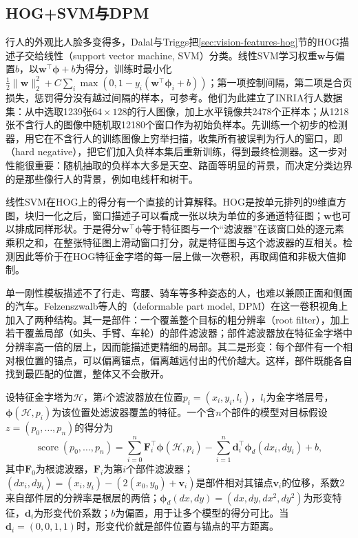 \subsection{HOG+SVM与DPM}
\label{sec:vision-features-dpm}
\label{sec:vision-features-hog-svm}

行人的外观比人脸多变得多，Dalal与Triggs把\ref{sec:vision-features-hog}节的HOG描述子交给线性（support vector machine, SVM）分类。线性SVM学习权重$\bm w$与偏置$b$，以$\bm w^{\top}\bm\phi+b$为得分，训练时最小化$\tfrac12\lVert\bm w\rVert_2^2+C\sum_i\max(0,1-y_i(\bm w^{\top}\bm\phi_i+b))$；第一项控制间隔，第二项是合页损失，惩罚得分没有越过间隔的样本，可参考。他们为此建立了INRIA行人数据集：从中选取1239张$64\times128$的行人图像，加上水平镜像共2478个正样本；从1218张不含行人的图像中随机取12180个窗口作为初始负样本。先训练一个初步的检测器，用它在不含行人的训练图像上穷举扫描，收集所有被误判为行人的窗口，即（hard negative），把它们加入负样本集后重新训练，得到最终检测器。这一步对性能很重要：随机抽取的负样本大多是天空、路面等明显的背景，而决定分类边界的是那些像行人的背景，例如电线杆和树干。

线性SVM在HOG上的得分有一个直接的计算解释。HOG是按单元排列的$9$维直方图，块归一化之后，窗口描述子可以看成一张以块为单位的多通道特征图；$\bm w$也可以排成同样形状。于是得分$\bm w^{\top}\bm\phi$等于特征图与一个“滤波器”在该窗口处的逐元素乘积之和，在整张特征图上滑动窗口打分，就是特征图与这个滤波器的互相关。检测因此等价于在HOG特征金字塔的每一层上做一次卷积，再取阈值和非极大值抑制。

单一刚性模板描述不了行走、弯腰、骑车等多种姿态的人，也难以兼顾正面和侧面的汽车。Felzenszwalb等人的（deformable part model, DPM）在这一卷积视角上加入了两种结构。其一是部件：一个覆盖整个目标的粗分辨率（root filter），加上若干覆盖局部（如头、手臂、车轮）的部件滤波器；部件滤波器放在特征金字塔中分辨率高一倍的层上，因而能描述更精细的局部。其二是形变：每个部件有一个相对根位置的锚点，可以偏离锚点，偏离越远付出的代价越大。这样，部件既能各自找到最匹配的位置，整体又不会散开。

设特征金字塔为$\mathcal H$，第$i$个滤波器放在位置$p_i=(x_i,y_i,l_i)$，$l_i$为金字塔层号，$\bm\phi(\mathcal H,p_i)$为该位置处滤波器覆盖的特征。一个含$n$个部件的模型对目标假设$z=(p_0,\ldots,p_n)$的得分为
\begin{equation}
  \operatorname{score}(p_0,\ldots,p_n)=\sum_{i=0}^{n}\bm F_i^{\top}\bm\phi(\mathcal H,p_i)-\sum_{i=1}^{n}\bm d_i^{\top}\bm\phi_d(dx_i,dy_i)+b,
  \label{eq:vision-features-dpm-score}
\end{equation}
其中$\bm F_0$为根滤波器，$\bm F_i$为第$i$个部件滤波器；$(dx_i,dy_i)=(x_i,y_i)-(2(x_0,y_0)+\bm v_i)$是部件相对其锚点$\bm v_i$的位移，系数$2$来自部件层的分辨率是根层的两倍；$\bm\phi_d(dx,dy)=(dx,dy,dx^2,dy^2)$为形变特征，$\bm d_i$为形变代价系数；$b$为偏置，用于让多个模型的得分可比。当$\bm d_i=(0,0,1,1)$时，形变代价就是部件位置与锚点的平方距离。

